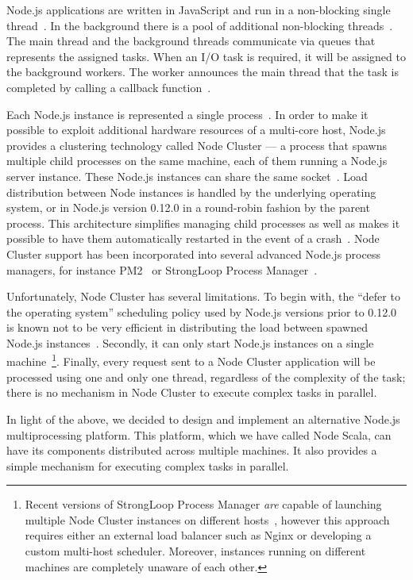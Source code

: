 \documentclass[10pt,conference,letterpaper]{IEEEtran}
\begin{document}
Node.js applications are written in JavaScript and run in a 
non-blocking single thread~\cite{books/daglib/0029097}. In the background
 there is a pool of additional non-blocking threads~\cite{Redkar14}. The 
 main thread and the background threads communicate via queues that 
 represents the assigned tasks. When an I/O task is required, it will be 
 assigned to the background workers. The worker announces the main thread 
 that the task is completed by calling a callback 
 function~\cite{Pasquali:2013:MN:2601491}.

 Each Node.js instance is represented a single
 process~\cite{books/daglib/0029097}. In order to make it possible to
 exploit additional hardware resources of a multi-core host, Node.js
 provides a clustering technology called Node Cluster --- a process
 that spawns multiple child processes on the same machine, each of
 them running a Node.js server instance. These Node.js instances can
 share the same socket~\cite{Node01}. Load distribution between Node
 instances is handled by the underlying operating system, or in
 Node.js version 0.12.0 in a round-robin fashion by the parent
 process. This architecture simplifies managing child processes as
 well as makes it possible to have them automatically restarted in the
 event of a crash~\cite{Node01}. Node Cluster support has been
 incorporated into several advanced Node.js process managers, for
 instance PM2~\cite{PM2} or StrongLoop Process
 Manager~\cite{SLPM}.

 Unfortunately, Node Cluster has several limitations. To begin with,
 the ``defer to the operating system'' scheduling policy used by
 Node.js versions prior to 0.12.0 is known not to be very efficient in
 distributing the load between spawned Node.js
 instances~\cite{StLo01}. Secondly, it can only start Node.js
 instances on a single machine~\footnote{Recent versions of StrongLoop
   Process Manager \emph{are} capable of launching multiple Node
   Cluster instances on different hosts~\cite{SLPMmultihost},
   however this approach requires either an external load balancer
   such as Nginx or developing a custom multi-host
   scheduler. Moreover, instances running on different machines are
   completely unaware of each other.}. Finally, every request sent to
 a Node Cluster application will be processed using one and only one
 thread, regardless of the complexity of the task; there is no
 mechanism in Node Cluster to execute complex tasks in parallel.

In light of the above, we decided to design and implement an
alternative Node.js multiprocessing platform. This platform, which we
have called Node Scala, can have its components distributed across
multiple machines. It also provides a simple mechanism for executing
complex tasks in parallel.
\end{document}
